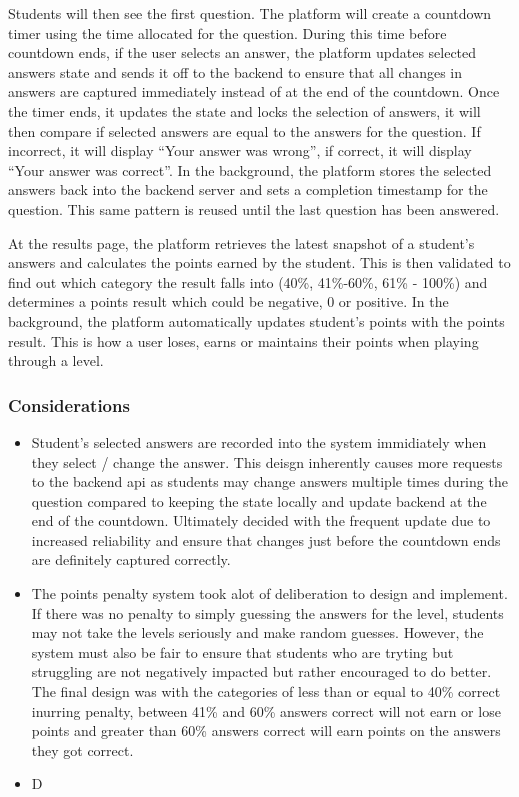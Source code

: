 Students will then see the first question. The platform will create a countdown timer using the time allocated for the question. During this time before countdown ends, if the user selects an answer, the platform updates selected answers state and sends it off to the backend to ensure that all changes in answers are captured immediately instead of at the end of the countdown. Once the timer ends, it updates the state and locks the selection of answers, it will then compare if selected answers are equal to the answers for the question. If incorrect, it will display “Your answer was wrong”, if correct, it will display “Your answer was correct”. In the background, the platform stores the selected answers back into the backend server and sets a completion timestamp for the question. This same pattern is reused until the last question has been answered. 

\newpage

At the results page, the platform retrieves the latest snapshot of a student's answers and calculates the points earned by the student. This is then validated to find out which category the result falls into (40\%, 41\%-60\%, 61\% - 100\%) and determines a points result which could be negative, 0 or positive. In the background, the platform automatically updates student’s points with the points result. This is how a user loses, earns or maintains their points when playing through a level.

\subsubsection{Considerations}
\begin{itemize}
    \item Student's selected answers are recorded into the system immidiately when they select / change the answer. This deisgn inherently causes more requests to the backend api as students may change answers multiple times during the question compared to keeping the state locally and update backend at the end of the countdown. Ultimately decided with the frequent update due to increased reliability and ensure that changes just before the countdown ends are definitely captured correctly.
    \item The points penalty system took alot of deliberation to design and implement. If there was no penalty to simply guessing the answers for the level, students may not take the levels seriously and make random guesses. However, the system must also be fair to ensure that students who are tryting but struggling are not negatively impacted but rather encouraged to do better. The final design was with the categories of less than or equal to 40\% correct inurring penalty, between 41\% and 60\% answers correct will not earn or lose points and greater than 60\% answers correct will earn points on the answers they got correct.
    \item D
\end{itemize}

